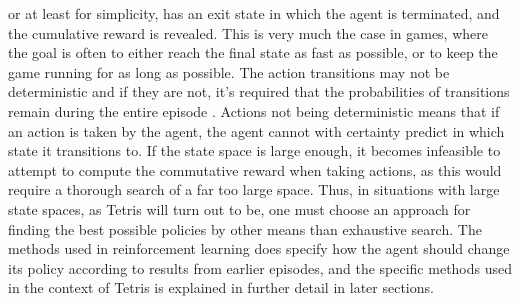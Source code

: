 or at least for simplicity, has an exit state
in which the agent is terminated, and the cumulative reward 
is revealed. This is very much the case in games, where the goal 
is often to either reach the final state as fast as possible,
or to keep the game running for as long as possible.
The action transitions may 
not be deterministic and if they are not,
it's required that the probabilities of transitions
remain during the entire episode \citep{Carr}. Actions not being deterministic
means that if an action is taken by the agent, the agent cannot 
with certainty predict in which state it transitions to.
If the state space 
is large enough, it becomes infeasible to attempt to compute 
the commutative reward when taking actions, as this would require
a thorough search of a far too large space. Thus, in situations 
with large state spaces, as Tetris will turn out to be, one must choose 
an approach for finding the best possible policies by other
means than exhaustive search. The methods used in reinforcement learning 
does specify how the agent should change its policy according to 
results from earlier episodes, and the specific methods used in
the context of Tetris is explained in further detail in later sections.













